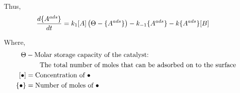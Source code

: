 Thus,
\begin{align}
    \frac{d \{A^{ads}\}}{dt} &= k_1 [A] \left( \Theta - \{A^{ads}\} \right)
                                - k_{-1} \{A^{ads}\}
                                - k \{A^{ads}\} [B]
    \label{eqn::eley_rideal}
\end{align}

Where,
\begin{align*}
    \Theta &- \text{Molar storage capacity of the catalyst:}\\
           &\qquad \text{The total number of moles that can be adsorbed on to the surface}\\
    \left[ \bullet \right] &= \text{Concentration of $\bullet$}\\
    \left\{ \bullet \right\} &= \text{Number of moles of $\bullet$}
\end{align*}

%
